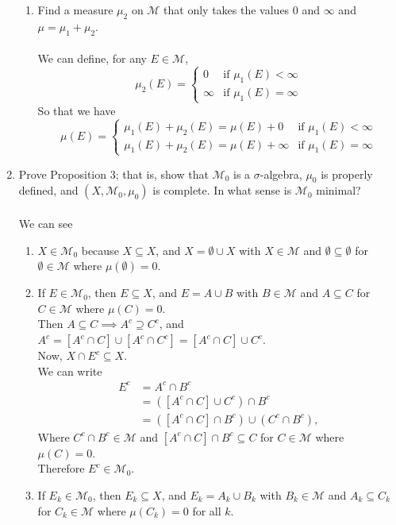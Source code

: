 \begin{enumerate}
\begin{enumerate}[label=(\roman*),align=left]
		\item Find a measure $\mu_2$ on $\mathcal{M}$ that only takes the values $0$ and $\infty$ and $\mu=\mu_1+\mu_2$.\\
		\\We can define, for any $E\in\mathcal{M}$, 
		\[
			\mu_2(E)=
			\begin{cases}
				0&\text{if }\mu_1(E)<\infty\\
				\infty&\text{if }\mu_1(E)=\infty
			\end{cases}
		\]
		So that we have
		\[
			\mu(E)=
			\begin{cases}
				\mu_1(E)+\mu_2(E)=\mu(E)+0&\text{if }\mu_1(E)<\infty\\
				\mu_1(E)+\mu_2(E)=\mu(E)+\infty&\text{if }\mu_1(E)=\infty
			\end{cases}
		\]
	\end{enumerate}
	\item Prove Proposition 3; that is, show that $\mathcal{M}_0$ is a $\sigma$-algebra, $\mu_0$ is properly defined, and $(X,\mathcal{M}_0,\mu_0)$ is complete. In what sense is $\mathcal{M}_0$ minimal?\\
	\\We can see
	\begin{enumerate}[label=(\roman*),align=left]
		\item $X\in\mathcal{M}_0$ because $X\subseteq X$, and $X=\emptyset\cup X$ with $X\in\mathcal{M}$ and $\emptyset\subseteq\emptyset$ for $\emptyset\in\mathcal{M}$ where $\mu(\emptyset)=0$.
		\item If $E\in\mathcal{M}_0$, then $E\subseteq X$, and $E=A\cup B$ with $B\in\mathcal{M}$ and $A\subseteq C$ for $C\in\mathcal{M}$ where $\mu(C)=0$.\\
		Then $A\subseteq C\implies A^c\supseteq C^c$, and $A^c=[A^c\cap C]\cup[A^c\cap C^c]=[A^c\cap C]\cup C^c$.
		\\Now, $X\cap E^c\subseteq X$.
		\\We can write
		\begin{align*}
			E^c&=A^c\cap B^c\\
			&=([A^c\cap C]\cup C^c)\cap B^c\\
			&=([A^c\cap C]\cap B^c)\cup (C^c\cap B^c),
		\end{align*}
		Where $C^c\cap B^c\in\mathcal{M}$ and $[A^c\cap C]\cap B^c\subseteq C$ for $C\in\mathcal{M}$ where $\mu(C)=0$.
		\\Therefore $E^c\in\mathcal{M}_0$.
		\item If $E_k\in\mathcal{M}_0$, then $E_k\subseteq X$, and $E_k=A_k\cup B_k$ with $B_k\in\mathcal{M}$ and $A_k\subseteq C_k$ for $C_k\in\mathcal{M}$ where $\mu(C_k)=0$ for all $k$.\\

\end{enumerate}
\end{enumerate}
